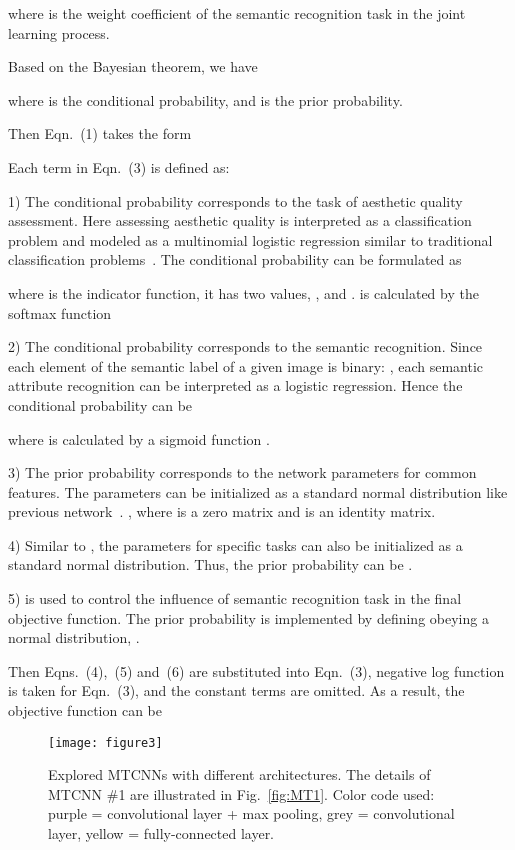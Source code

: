 \documentclass[journal]{IEEEtran}
\begin{document}
where  is the weight coefficient of the semantic recognition task in the joint learning process.

Based on the Bayesian theorem, we have

where  is the conditional probability, and  is the prior probability.

Then Eqn.~(1) takes the form

Each term in Eqn.~(3) is defined as:

1) The conditional probability  corresponds to the task of aesthetic quality assessment. Here assessing aesthetic quality is interpreted as a classification problem and modeled as a multinomial logistic regression similar to traditional classification problems~\cite{Krizhevsky12}. The conditional probability  can be formulated as

where  is the indicator function, it has two values, , and .  is calculated by the softmax function


2) The conditional probability  corresponds to the semantic recognition. Since each element of the semantic label of a given image is binary: , each semantic attribute recognition can be interpreted as a logistic regression. Hence the conditional probability  can be

where  is calculated by a sigmoid function .

3) The prior probability  corresponds to the network parameters for common features. The parameters  can be initialized as a standard normal distribution like previous network~\cite{Krizhevsky12}. , where  is a zero matrix and  is an identity matrix.

4) Similar to , the parameters  for specific tasks can also be initialized as a standard normal distribution. Thus, the prior probability can be .

5)  is used to control the influence of semantic recognition task in the final objective function. The prior probability  is implemented by defining  obeying a normal distribution, .


Then Eqns.~(4),~(5) and~(6) are substituted into Eqn.~(3), negative log function is taken for Eqn.~(3), and the constant terms are omitted. As a result, the objective function can be


\begin{figure*}
  \centering
\texttt{[image: figure3]}\\
\caption{Explored MTCNNs with different architectures. The details of MTCNN \#1 are illustrated in Fig.~\ref{fig:MT1}. Color code used: purple = convolutional layer + max pooling, grey = convolutional layer, yellow = fully-connected layer.}
  \label{fig:mt4}
\end{figure*}
\end{document}
